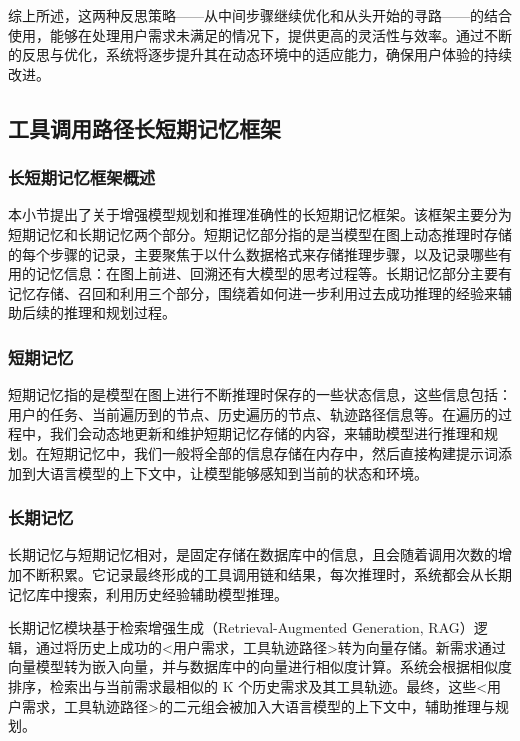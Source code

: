 综上所述，这两种反思策略——从中间步骤继续优化和从头开始的寻路——的结合使用，能够在处理用户需求未满足的情况下，提供更高的灵活性与效率。通过不断的反思与优化，系统将逐步提升其在动态环境中的适应能力，确保用户体验的持续改进。

\subsection{工具调用路径长短期记忆框架}

\subsubsection{长短期记忆框架概述}

本小节提出了关于增强模型规划和推理准确性的长短期记忆框架。该框架主要分为短期记忆和长期记忆两个部分。短期记忆部分指的是当模型在图上动态推理时存储的每个步骤的记录，主要聚焦于以什么数据格式来存储推理步骤，以及记录哪些有用的记忆信息：在图上前进、回溯还有大模型的思考过程等。长期记忆部分主要有记忆存储、召回和利用三个部分，围绕着如何进一步利用过去成功推理的经验来辅助后续的推理和规划过程。

\subsubsection{短期记忆}

短期记忆指的是模型在图上进行不断推理时保存的一些状态信息，这些信息包括：用户的任务、当前遍历到的节点、历史遍历的节点、轨迹路径信息等。在遍历的过程中，我们会动态地更新和维护短期记忆存储的内容，来辅助模型进行推理和规划。在短期记忆中，我们一般将全部的信息存储在内存中，然后直接构建提示词添加到大语言模型的上下文中，让模型能够感知到当前的状态和环境。

\subsubsection{长期记忆}

长期记忆与短期记忆相对，是固定存储在数据库中的信息，且会随着调用次数的增加不断积累。它记录最终形成的工具调用链和结果，每次推理时，系统都会从长期记忆库中搜索，利用历史经验辅助模型推理。

长期记忆模块基于检索增强生成（Retrieval-Augmented Generation, RAG）逻辑，通过将历史上成功的<用户需求，工具轨迹路径>转为向量存储。新需求通过向量模型转为嵌入向量，并与数据库中的向量进行相似度计算。系统会根据相似度排序，检索出与当前需求最相似的 K 个历史需求及其工具轨迹。最终，这些<用户需求，工具轨迹路径>的二元组会被加入大语言模型的上下文中，辅助推理与规划。


